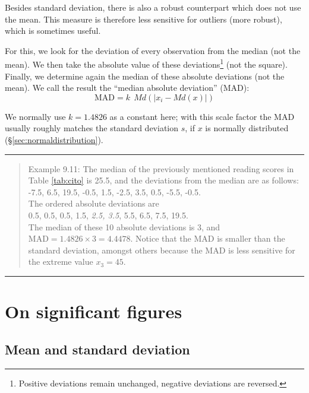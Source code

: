 \documentclass[
]{book}
\begin{document}
Besides standard deviation, there is also a robust counterpart
which does not use the mean. This measure is therefore less
sensitive for outliers (more robust), which is sometimes useful.

For this, we look for the deviation of every observation from
the median (not the mean). We then take the absolute value
of these deviations\footnote{Positive deviations remain unchanged, negative deviations are reversed.} (not the square). Finally, we
determine again the median of these absolute deviations (not the mean).
We call the result the ``median absolute deviation'' (MAD):
\begin{equation}
  \textrm{MAD} = k ~~ Md ( |x_i - Md(x) |)
  \label{eq:MAD}
\end{equation}

We normally use \(k=1.4826\) as a constant here; with this scale factor the MAD
usually roughly matches the standard deviation \(s\), if \(x\) is
normally distributed (§\ref{sec:normaldistribution}).

\begin{center}\rule{0.5\linewidth}{0.5pt}\end{center}

\begin{quote}
Example 9.11:
The median of the previously mentioned reading scores in
Table \ref{tab:cito} is
25.5, and the deviations from the median are as follows:\\
-7.5, 6.5, 19.5, -0.5, 1.5, -2.5, 3.5, 0.5, -5.5, -0.5.\\
The ordered absolute deviations are\\
0.5, 0.5, 0.5, 1.5, \emph{2.5, 3.5}, 5.5, 6.5, 7.5, 19.5.\\
The median of these 10 absolute deviations is 3, and
\(\textrm{MAD} = 1.4826 \times 3 = 4.4478\). Notice that the MAD
is smaller than the standard deviation, amongst others because the MAD is less sensitive
for the extreme value \(x_3=45\).
\end{quote}

\begin{center}\rule{0.5\linewidth}{0.5pt}\end{center}

\hypertarget{sec:significantfigures}{%
\section{On significant figures}\label{sec:significantfigures}}

\hypertarget{sec:significantfigures-means}{%
\subsection{Mean and standard deviation}\label{sec:significantfigures-means}}
\end{document}
